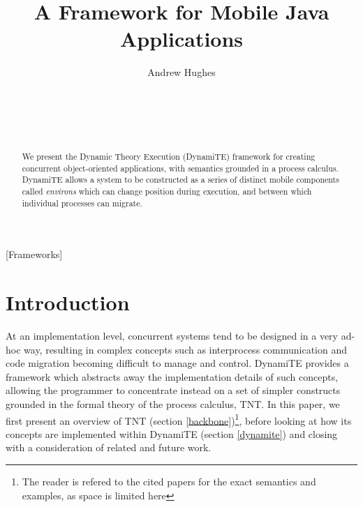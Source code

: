 \documentclass{acm_proc_article-sp}
\begin{document}
\title{A Framework for Mobile Java Applications}
\author{
\alignauthor
Andrew Hughes\\
       \\
       \\
       \\
       \\
}
\maketitle

\begin{abstract}
We present the Dynamic Theory Execution (DynamiTE) framework for
 creating concurrent object-oriented applications, with semantics
 grounded in a process calculus.  DynamiTE allows a system to be
 constructed as a series of distinct mobile components called
 \emph{environs} which can change position during execution, and between
 which individual processes can migrate.
\end{abstract}

[Frameworks]



\section{Introduction}

At an implementation level, concurrent systems tend to be designed in a
very ad-hoc way, resulting in complex concepts such as interprocess
communication and code migration becoming difficult to manage and
control.  DynamiTE provides a framework which abstracts away the
implementation details of such concepts, allowing the programmer to
concentrate instead on a set of simpler constructs grounded in the
formal theory of the process calculus, TNT.  In this paper, we first
present an overview of TNT (section \ref{backbone})\footnote{The reader
is refered to the cited papers for the exact semantics and examples, as
space is limited here}, before looking at how its concepts are
implemented within DynamiTE (section \ref{dynamite}) and closing with a
consideration of related and future work.
 
\end{document}
